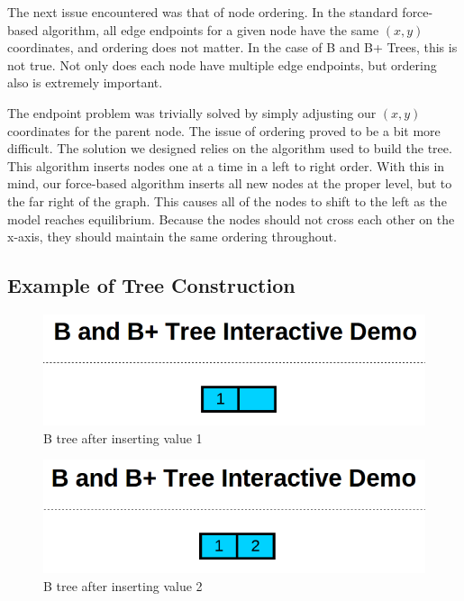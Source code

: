 The next issue encountered was that of node ordering. In the
standard force-based algorithm, all edge endpoints for a given node
have the same $(x,y)$ coordinates, and ordering does not matter. In
the case of B and B+ Trees, this is not true. Not only does each node
have multiple edge endpoints, but ordering also is extremely
important.

The endpoint problem was trivially solved by simply adjusting our
$(x,y)$ coordinates for the parent node. The issue of ordering proved
to be a bit more difficult. The solution we designed relies on the
algorithm used to build the tree. This algorithm inserts nodes one at
a time in a left to right order. With this in mind, our force-based
algorithm inserts all new nodes at the proper level, but to the far
right of the graph. This causes all of the nodes to shift to the left
as the model reaches equilibrium. Because the nodes should not cross
each other on the x-axis, they should maintain the same ordering throughout.

\subsection{Example of Tree Construction}

\begin{figure}[htp!]
\centering
\includegraphics[scale=0.25]{images/Insert_one.png}
\caption{B tree after inserting value 1}
\label{EX1}
\end{figure}

\begin{figure}[htp!]
\centering
\includegraphics[scale=0.25]{images/Insert_two.png}
\caption{B tree after inserting value 2}
\label{EX2}
\end{figure}

